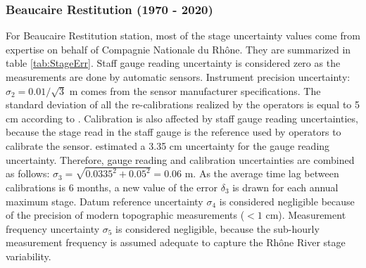 \documentclass[11pt]{article}
\begin{document}
    \subsubsection{Beaucaire Restitution (1970 - 2020)}
    
    For Beaucaire Restitution station, most of the stage uncertainty values come from \citet{cetiat_conference_2005} expertise on behalf of Compagnie Nationale du Rhône. They are summarized in table \ref{tab:StageErr}. Staff gauge reading uncertainty is considered zero as the measurements are done by automatic sensors. Instrument precision uncertainty: $\sigma_2 = 0.01/\sqrt{3}$ m comes from the sensor manufacturer specifications. The standard deviation of all the re-calibrations realized by the operators is equal to 5 cm according to \citet{cetiat_conference_2005}. Calibration is also affected by staff gauge reading uncertainties, because the stage read in the staff gauge is the reference used by operators to calibrate the sensor. \citet{cetiat_conference_2005} estimated a 3.35 cm uncertainty for the gauge reading uncertainty. Therefore, gauge reading and calibration uncertainties are combined as follows: $\sigma_3 = \sqrt{0.0335^2 + 0.05^2} = 0.06$ m. As the average time lag between calibrations is 6 months, a new value of the error $\delta_3$ is drawn for each annual maximum stage. Datum reference uncertainty $\sigma_4$ is considered negligible because of the precision of modern topographic measurements ($<1$ cm). Measurement frequency uncertainty $\sigma_5$ is considered negligible, because the sub-hourly measurement frequency is assumed adequate to capture the Rhône River stage variability. 
        
\end{document}
